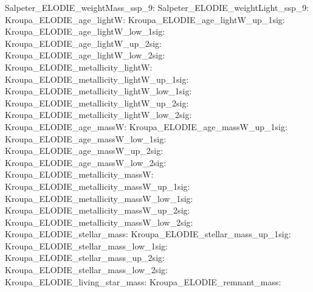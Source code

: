 Salpeter\_ELODIE\_weightMass\_ssp\_9:  \newline 
Salpeter\_ELODIE\_weightLight\_ssp\_9:  \newline 
Kroupa\_ELODIE\_age\_lightW:  \newline 
Kroupa\_ELODIE\_age\_lightW\_up\_1sig:  \newline 
Kroupa\_ELODIE\_age\_lightW\_low\_1sig:  \newline 
Kroupa\_ELODIE\_age\_lightW\_up\_2sig:  \newline 
Kroupa\_ELODIE\_age\_lightW\_low\_2sig:  \newline 
Kroupa\_ELODIE\_metallicity\_lightW:  \newline 
Kroupa\_ELODIE\_metallicity\_lightW\_up\_1sig:  \newline 
Kroupa\_ELODIE\_metallicity\_lightW\_low\_1sig:  \newline 
Kroupa\_ELODIE\_metallicity\_lightW\_up\_2sig:  \newline 
Kroupa\_ELODIE\_metallicity\_lightW\_low\_2sig:  \newline 
Kroupa\_ELODIE\_age\_massW:  \newline 
Kroupa\_ELODIE\_age\_massW\_up\_1sig:  \newline 
Kroupa\_ELODIE\_age\_massW\_low\_1sig:  \newline 
Kroupa\_ELODIE\_age\_massW\_up\_2sig:  \newline 
Kroupa\_ELODIE\_age\_massW\_low\_2sig:  \newline 
Kroupa\_ELODIE\_metallicity\_massW:  \newline 
Kroupa\_ELODIE\_metallicity\_massW\_up\_1sig:  \newline 
Kroupa\_ELODIE\_metallicity\_massW\_low\_1sig:  \newline 
Kroupa\_ELODIE\_metallicity\_massW\_up\_2sig:  \newline 
Kroupa\_ELODIE\_metallicity\_massW\_low\_2sig:  \newline 
Kroupa\_ELODIE\_stellar\_mass:  \newline 
Kroupa\_ELODIE\_stellar\_mass\_up\_1sig:  \newline 
Kroupa\_ELODIE\_stellar\_mass\_low\_1sig:  \newline 
Kroupa\_ELODIE\_stellar\_mass\_up\_2sig:  \newline 
Kroupa\_ELODIE\_stellar\_mass\_low\_2sig:  \newline 
Kroupa\_ELODIE\_living\_star\_mass:  \newline 
Kroupa\_ELODIE\_remnant\_mass:  \newline 
